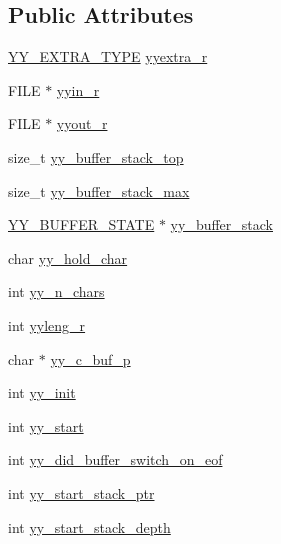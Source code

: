 \subsection*{\-Public \-Attributes}
\begin{DoxyCompactItemize}
\item 
\hyperlink{scanner__internal_8h_a26938d921de835f6183c02e54cf08828}{\-Y\-Y\-\_\-\-E\-X\-T\-R\-A\-\_\-\-T\-Y\-P\-E} \hyperlink{structyyguts__t_aef05c0d6725a5214f6b30466f0b01c47}{yyextra\-\_\-r}
\item 
\-F\-I\-L\-E $\ast$ \hyperlink{structyyguts__t_a21f81ca100b12364a5095a37d1c6f650}{yyin\-\_\-r}
\item 
\-F\-I\-L\-E $\ast$ \hyperlink{structyyguts__t_a436368a905aaf12e809e265749c74031}{yyout\-\_\-r}
\item 
size\-\_\-t \hyperlink{structyyguts__t_af92507d904af2fcd4509acde654a9850}{yy\-\_\-buffer\-\_\-stack\-\_\-top}
\item 
size\-\_\-t \hyperlink{structyyguts__t_a4435bb91e87f9988b096afc21386289a}{yy\-\_\-buffer\-\_\-stack\-\_\-max}
\item 
\hyperlink{scanner_8c_a4e5bd2d129903df83f3d13effaf8f3e4}{\-Y\-Y\-\_\-\-B\-U\-F\-F\-E\-R\-\_\-\-S\-T\-A\-T\-E} $\ast$ \hyperlink{structyyguts__t_ad0b9d576189d518a4482f20ed9b2a416}{yy\-\_\-buffer\-\_\-stack}
\item 
char \hyperlink{structyyguts__t_adde3f71374c223bbac47284824996e86}{yy\-\_\-hold\-\_\-char}
\item 
int \hyperlink{structyyguts__t_a99c9218941829a6662d358422fd4184a}{yy\-\_\-n\-\_\-chars}
\item 
int \hyperlink{structyyguts__t_aba739bc731f0e9cbb0b6bdfca7930ebd}{yyleng\-\_\-r}
\item 
char $\ast$ \hyperlink{structyyguts__t_ab1b9bcacb33aab1e02b625512bc0e221}{yy\-\_\-c\-\_\-buf\-\_\-p}
\item 
int \hyperlink{structyyguts__t_abbef56b2d8359f6a15629c104f5dd030}{yy\-\_\-init}
\item 
int \hyperlink{structyyguts__t_a8baf7d47fe53035d9bc2a9670795ff01}{yy\-\_\-start}
\item 
int \hyperlink{structyyguts__t_a2daec411627700709ef2fd927e69627d}{yy\-\_\-did\-\_\-buffer\-\_\-switch\-\_\-on\-\_\-eof}
\item 
int \hyperlink{structyyguts__t_ad9e132dacc2904a8ae76c64c72e33795}{yy\-\_\-start\-\_\-stack\-\_\-ptr}
\item 
int \hyperlink{structyyguts__t_a35bedf1c17debd766565b99c39132eb4}{yy\-\_\-start\-\_\-stack\-\_\-depth}

\end{DoxyCompactItemize}
